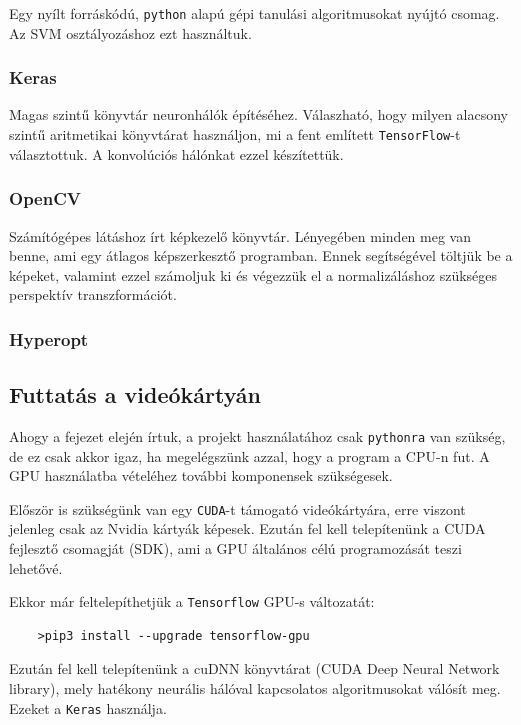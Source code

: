 Egy nyílt forráskódú, \texttt{python} alapú gépi tanulási algoritmusokat nyújtó csomag. 
Az SVM osztályozáshoz ezt használtuk.


\subsubsection{Keras}

Magas szintű könyvtár neuronhálók építéséhez. Válaszható, hogy milyen alacsony szintű
aritmetikai könyvtárat használjon, mi a fent említett \texttt{TensorFlow}-t választottuk.
A konvolúciós hálónkat ezzel készítettük.

\subsubsection{OpenCV}

Számítógépes látáshoz írt képkezelő könyvtár. Lényegében minden meg van benne, ami egy
átlagos képszerkesztő programban. Ennek segítségével töltjük be a képeket, valamint 
ezzel számoljuk ki és végezzük el a normalizáláshoz szükséges perspektív transzformációt.


\subsubsection{Hyperopt}

\subsection{Futtatás a videókártyán}
\label{sec:gpu.kovetelmenyek}

Ahogy a fejezet elején írtuk, a projekt használatához csak \texttt{pythonra} van szükség,
de ez csak akkor igaz, ha megelégszünk azzal, hogy a program a CPU-n fut. A GPU 
használatba vételéhez további komponensek szükségesek.


Először is szükségünk van egy \texttt{CUDA}-t támogató videókártyára, erre viszont jelenleg csak
az Nvidia kártyák képesek. Ezután fel kell telepítenünk a CUDA fejlesztő csomagját (SDK), ami a
GPU általános célú programozását teszi lehetővé. 


Ekkor már feltelepíthetjük a \texttt{Tensorflow} GPU-s változatát:
\begin{lstlisting}
	>pip3 install --upgrade tensorflow-gpu
\end{lstlisting}



Ezután fel kell telepítenünk a cuDNN könyvtárat (CUDA Deep Neural Network library), 
mely hatékony neurális hálóval kapcsolatos algoritmusokat válósít meg. Ezeket a 
\texttt{Keras} használja.


